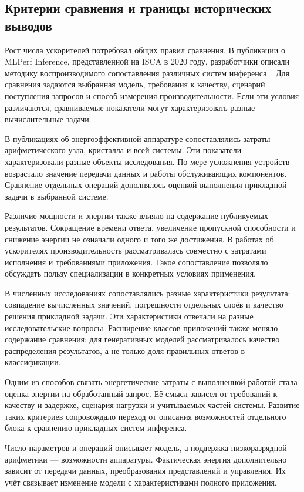 \subsection{Критерии сравнения и границы исторических выводов}

Рост числа ускорителей потребовал общих правил сравнения.
В публикации о MLPerf Inference, представленной на ISCA
в 2020 году, разработчики описали методику воспроизводимого
сопоставления различных систем инференса~\cite{mlperf2020}.
Для сравнения задаются выбранная модель, требования
к качеству, сценарий поступления запросов и способ измерения
производительности. Если эти условия различаются, сравниваемые показатели могут характеризовать
разные вычислительные задачи.

В публикациях об энергоэффективной аппаратуре сопоставлялись
затраты арифметического узла, кристалла и всей системы.
Эти показатели характеризовали разные объекты исследования.
По мере усложнения устройств возрастало значение передачи
данных и работы обслуживающих компонентов.
Сравнение отдельных операций дополнялось оценкой выполнения
прикладной задачи в выбранной системе.

Различие мощности и энергии также влияло на содержание
публикуемых результатов. Сокращение времени ответа,
увеличение пропускной способности и снижение энергии
не означали одного и того же достижения.
В работах об ускорителях производительность рассматривалась
совместно с затратами исполнения и требованиями приложения.
Такое сопоставление позволяло обсуждать пользу специализации
в конкретных условиях применения.

В численных исследованиях сопоставлялись разные характеристики
результата: совпадение вычисленных значений, погрешности
отдельных слоёв и качество решения прикладной задачи.
Эти характеристики отвечали на разные исследовательские
вопросы. Расширение классов приложений также меняло
содержание сравнения: для генеративных моделей
рассматривалось качество распределения результатов,
а не только доля правильных ответов в классификации.

Одним из способов связать энергетические затраты
с выполненной работой стала оценка энергии на обработанный
запрос. Её смысл зависел от требований к качеству и задержке,
сценария нагрузки и учитываемых частей системы.
Развитие таких критериев сопровождало переход от описания
возможностей отдельного блока к сравнению прикладных
систем инференса.

Число параметров и операций описывает модель, а поддержка
низкоразрядной арифметики — возможности аппаратуры.
Фактическая энергия дополнительно зависит от передачи данных,
преобразования представлений и управления. Их учёт связывает
изменение модели с характеристиками полного приложения.

